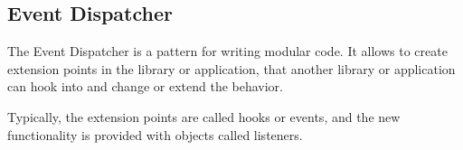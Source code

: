 \subsection{Event Dispatcher} \label{sec:theory:event-dispatcher}

The Event Dispatcher is a pattern for writing modular code. It allows to create extension points in the library or application, that another library or application can hook into and change or extend the behavior.

Typically, the extension points are called hooks or events, and the new functionality is provided with objects called listeners.

